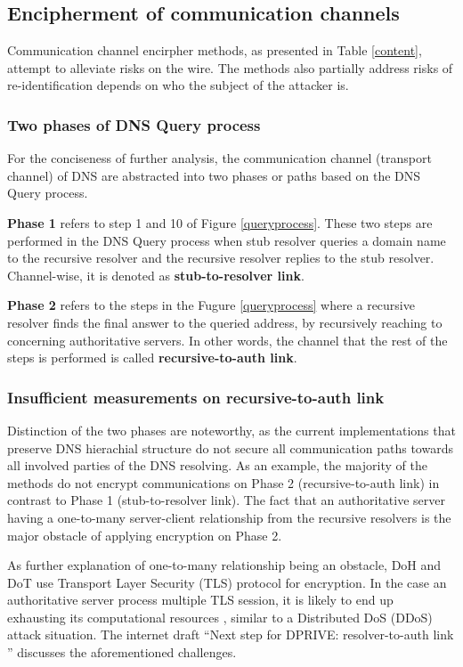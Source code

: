 \subsection{Encipherment of communication channels}
Communication channel encirpher methods, as presented in Table \ref{content}, attempt to alleviate risks on the wire. The methods also partially address risks of re-identification depends on who the subject of the attacker is. 

\subsubsection{Two phases of DNS Query process}
For the conciseness of further analysis, the communication channel (transport channel) of DNS are abstracted into two phases or paths based on the DNS Query process.

\textbf{Phase 1} refers to step 1 and 10 of Figure \ref{queryprocess}. These two steps are performed in the DNS Query process when stub resolver queries a domain name to the recursive resolver and the recursive resolver replies to the stub resolver.
Channel-wise, it is denoted as \textbf{stub-to-resolver link}.

\textbf{Phase 2} refers to the steps in the Fugure \ref{queryprocess} where a recursive resolver finds the final answer to the queried address, by recursively reaching to concerning authoritative servers. In other words, the channel that the rest of the steps is performed is called \textbf{recursive-to-auth link}.

\subsubsection{Insufficient measurements on recursive-to-auth link}
Distinction of the two phases are noteworthy, as the current implementations that preserve DNS hierachial structure do not secure all communication paths towards all involved parties of the DNS resolving.
As an example, the majority of the methods do not encrypt communications on Phase 2 (recursive-to-auth link) in contrast to Phase 1 (stub-to-resolver link).
The fact that an authoritative server having a one-to-many server-client relationship from the recursive resolvers is the major obstacle of applying encryption on Phase 2.

As further explanation of one-to-many relationship being an obstacle, DoH \cite{rfc8484} and DoT \cite{hu2016specification} use Transport Layer Security (TLS) protocol \cite{rfc7858} for encryption. In the case an authoritative server process multiple TLS session, it is likely to end up exhausting its computational resources \cite{bhople2012server}, similar to a Distributed DoS (DDoS) attack situation. The internet draft ``Next step for DPRIVE: resolver-to-auth link \cite{I-D.bortzmeyer-dprive-step-2}'' discusses the aforementioned challenges.

